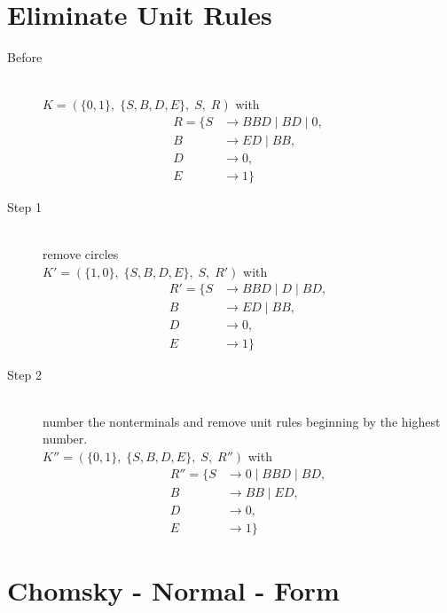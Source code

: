 \documentclass{article}
\begin{document}
\section{Eliminate Unit Rules}

\begin{description}
	\item[Before] \hfill \\ 
		$K=\left(\{	0, 1\},\;\{ S, B, D, E\},\;S,\;R\right)$ with
	\begin{align*}
		R=\{	S &\rightarrow BBD\;|\;BD\;|\;0, \\ 
		B &\rightarrow ED\;|\;BB, \\ 
		D &\rightarrow 0, \\ 
		E &\rightarrow 1\}
	\end{align*}
	\item[Step 1] \hfill \\ 
	remove circles\\ 
	$K'=\left(\{	1, 0\},\;\{ S, B, D, E\},\;S,\;R'\right)$ with
	\begin{align*}
		R'=\{	S &\rightarrow BBD\;|\;D\;|\;BD, \\ 
		B &\rightarrow ED\;|\;BB, \\ 
		D &\rightarrow 0, \\ 
		E &\rightarrow 1\}
	\end{align*}
	\item[Step 2] \hfill \\ 
	number the nonterminals and remove unit rules beginning by the highest number.\\ 
	$K''=\left(\{	0, 1\},\;\{ S, B, D, E\},\;S,\;R''\right)$ with
	\begin{align*}
		R''=\{	S &\rightarrow 0\;|\;BBD\;|\;BD, \\ 
		B &\rightarrow BB\;|\;ED, \\ 
		D &\rightarrow 0, \\ 
		E &\rightarrow 1\}
	\end{align*}
\end{description}

\section{Chomsky - Normal - Form}
\end{document}
